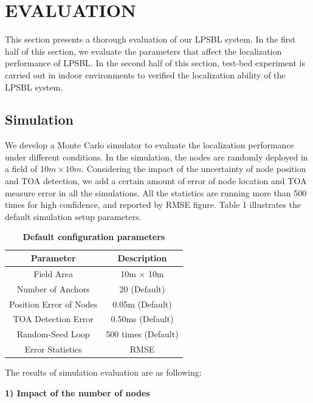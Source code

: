 \section{EVALUATION }
\label{section:results}
This section presents a thorough evaluation of our LPSBL system.
In the first half of this section, we evaluate the parameters that affect the localization performance of LPSBL.
In the second half of this section, test-bed experiment is carried out in indoor environments to verified the localization ability of the LPSBL system.

\subsection{Simulation}
We develop a Monte Carlo simulator to evaluate the localization performance under different conditions.
In the simulation, the nodes are randomly deployed in a field of $10m \times 10m$. 
Considering the impact of the uncertainty of node position and TOA detection, we add a certain amount of error of node location and TOA measure error in all the simulations.
All the statistics are running more than 500 times for high confidence, and reported by RMSE figure. 
Table 1 illustrates the default simulation setup parameters.
\begin{table} [!h] \normalsize
\caption {\textbf{Default configuration parameters}} %
\centering %
    \begin{tabular}{|c|c|}
        \hline
Parameter & Description \\
 \hline
Field Area & 10m $\times$ 10m \\
\hline
Number of Anchors & 20 (Default) \\
 \hline
Position Error of Nodes	 & 0.05m (Default) \\
 \hline
TOA Detection Error 	 & 0.50ms (Default) \\
 \hline
Random-Seed Loop	 & 500 times (Default) \\
 \hline
Error Statistics	 &  RMSE \\
        \hline
    \end{tabular}
\end{table}

The results of simulation evaluation are as following:

\textbf{1) Impact of the number of nodes}

